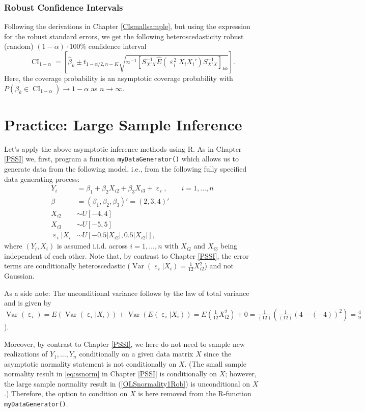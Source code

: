 \documentclass[
  14pt,
]{memoir}
\DeclareMathOperator{\eps}{\varepsilon}
\DeclareMathOperator{\V}{\operatorname{Var}}
\begin{document}
\hypertarget{robust-confidence-intervals}{%
\subsubsection{Robust Confidence Intervals}\label{robust-confidence-intervals}}

Following the derivations in Chapter \ref{CIsmallsample}, but using the expression for the robust standard errors, we get the following heteroscedasticity robust (random) \((1-\alpha)\cdot 100\%\) confidence interval
\[
\operatorname{CI}_{1-\alpha}=
\left[\hat\beta_k\pm t_{1-\alpha/2,n-K}\sqrt{n^{-1}[S_{X'X}^{-1}\widehat{E}(\eps^2_iX_iX_i')S^{-1}_{X'X}]_{kk}}\right].
\]
Here, the coverage probability is an asymptotic coverage probability with \(P(\beta_k\in\operatorname{CI}_{1-\alpha})\to 1-\alpha\) as \(n\to\infty\).

\hypertarget{practice-large-sample-inference}{%
\section{Practice: Large Sample Inference}\label{practice-large-sample-inference}}

Let's apply the above asymptotic inference methods using \textsf{R}. As in Chapter \ref{PSSI} we, first, program a function \texttt{myDataGenerator()} which allows us to generate data from the following model, i.e., from the following fully specified data generating process:
\begin{align*}
Y_i &=\beta_1+\beta_2X_{i2}+\beta_3X_{i3}+\eps_i,\qquad i=1,\dots,n\\
\beta &=(\beta_1,\beta_2,\beta_3)'=(2,3,4)'\\
X_{i2}&\sim U[-4,4]\\
X_{i3}&\sim U[-5,5]\\
\eps_i|X_i&\sim U[-0.5 |X_{i2}|, 0.5 |X_{i2}|],
\end{align*}
where \((Y_i,X_i)\) is assumed i.i.d. across \(i=1,\dots,n\) with \(X_{i2}\) and \(X_{i3}\) being independent of each other. Note that, by contrast to Chapter \ref{PSSI}, the error terms are conditionally heteroscedastic (\(\V(\eps_i|X_i)=\frac{1}{12}X_{i2}^2\)) and not Gaussian.

As a side note: The unconditional variance follows by the law of total variance and is given by \(\V(\eps_i)=E(\V(\eps_i|X_i))+\V(E(\eps_i|X_i))=E(\frac{1}{12}X_{i2}^2)+0=\frac{1}{(12)}(\frac{1}{(12)}(4-(-4))^2)=\frac{4}{9}\)).

Moreover, by contrast to Chapter \ref{PSSI}, we here do not need to sample new realizations of \(Y_1,\dots,Y_n\) conditionally on a given data matrix \(X\) since the asymptotic normality statement is not conditionally on \(X\). (The small sample normality result in \eqref{eq:ssnorm} in Chapter \ref{PSSI} is conditionally on \(X\); however, the large sample normality result in (\ref{OLSnormality1Rob}) is unconditional on \(X\).) Therefore, the option to condition on \(X\) is here removed from the \textsf{R}-function \texttt{myDataGenerator()}.
\end{document}
